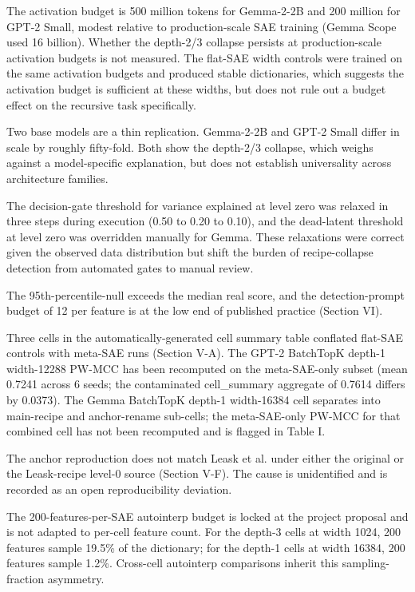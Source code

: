 \documentclass[conference]{IEEEtran}
\begin{document}
The activation budget is 500 million tokens for Gemma-2-2B and 200
million for GPT-2 Small, modest relative to production-scale SAE
training (Gemma Scope used 16 billion). Whether the depth-2/3 collapse
persists at production-scale activation budgets is not measured. The
flat-SAE width controls were trained on the same activation budgets and
produced stable dictionaries, which suggests the activation budget is
sufficient at these widths, but does not rule out a budget effect on the
recursive task specifically.

Two base models are a thin replication. Gemma-2-2B and GPT-2 Small
differ in scale by roughly fifty-fold. Both show the depth-2/3 collapse,
which weighs against a model-specific explanation, but does not
establish universality across architecture families.

The decision-gate threshold for variance explained at level zero was
relaxed in three steps during execution (0.50 to 0.20 to 0.10), and the
dead-latent threshold at level zero was overridden manually for Gemma.
These relaxations were correct given the observed data distribution but
shift the burden of recipe-collapse detection from automated gates to
manual review.

The 95th-percentile-null exceeds the median real score, and the
detection-prompt budget of 12 per feature is at the low end of published
practice (Section VI).

Three cells in the automatically-generated cell summary table conflated
flat-SAE controls with meta-SAE runs (Section V-A). The GPT-2 BatchTopK
depth-1 width-12288 PW-MCC has been recomputed on the meta-SAE-only
subset (mean 0.7241 across 6 seeds; the contaminated cell\_summary
aggregate of 0.7614 differs by 0.0373). The Gemma BatchTopK depth-1
width-16384 cell separates into main-recipe and anchor-rename sub-cells;
the meta-SAE-only PW-MCC for that combined cell has not been recomputed
and is flagged in Table I.

The anchor reproduction does not match Leask et al.
\autocite{leask2025sparse} under either the original or the Leask-recipe
level-0 source (Section V-F). The cause is unidentified and is recorded
as an open reproducibility deviation.

The 200-features-per-SAE autointerp budget is locked at the project
proposal and is not adapted to per-cell feature count. For the depth-3
cells at width 1024, 200 features sample 19.5\% of the dictionary; for
the depth-1 cells at width 16384, 200 features sample 1.2\%. Cross-cell
autointerp comparisons inherit this sampling-fraction asymmetry.
\end{document}
